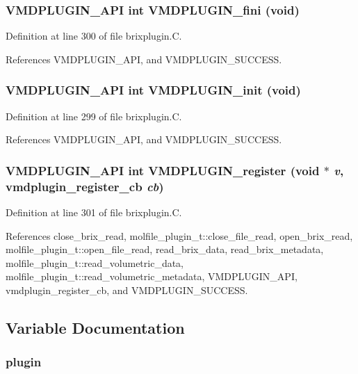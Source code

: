 \subsubsection{\setlength{\rightskip}{0pt plus 5cm}VMDPLUGIN\_\-API int VMDPLUGIN\_\-fini (void)}\label{brixplugin_8C_a7}




Definition at line 300 of file brixplugin.C.

References VMDPLUGIN\_\-API, and VMDPLUGIN\_\-SUCCESS.
\subsubsection{\setlength{\rightskip}{0pt plus 5cm}VMDPLUGIN\_\-API int VMDPLUGIN\_\-init (void)}\label{brixplugin_8C_a6}




Definition at line 299 of file brixplugin.C.

References VMDPLUGIN\_\-API, and VMDPLUGIN\_\-SUCCESS.
\subsubsection{\setlength{\rightskip}{0pt plus 5cm}VMDPLUGIN\_\-API int VMDPLUGIN\_\-register (void $\ast$ {\em v}, {\bf vmdplugin\_\-register\_\-cb} {\em cb})}\label{brixplugin_8C_a8}




Definition at line 301 of file brixplugin.C.

References close\_\-brix\_\-read, molfile\_\-plugin\_\-t::close\_\-file\_\-read, open\_\-brix\_\-read, molfile\_\-plugin\_\-t::open\_\-file\_\-read, read\_\-brix\_\-data, read\_\-brix\_\-metadata, molfile\_\-plugin\_\-t::read\_\-volumetric\_\-data, molfile\_\-plugin\_\-t::read\_\-volumetric\_\-metadata, VMDPLUGIN\_\-API, vmdplugin\_\-register\_\-cb, and VMDPLUGIN\_\-SUCCESS.

\subsection{Variable Documentation}
\subsubsection{ plugin\hspace{0.3cm}{\tt  [static]}}\label{brixplugin_8C_a1}


